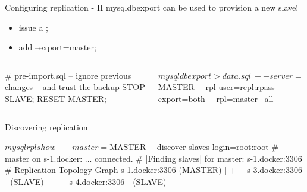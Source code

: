 \documentclass{beamer}[10]
\begin{document}
\begin{pyframe}{Configuring replication - II}
mysqldbexport can be used to provision a new slave!
\begin{itemize}
\item issue a ;
\item add --export=master;
\end{itemize}

\begin{columns}

\begin{bashcode}
# pre-import.sql
-- ignore previous changes
-- and trust the backup
STOP SLAVE;
RESET MASTER;
\end{bashcode}

\begin{pycode}
$ mysqldbexport > data.sql \
 --server=$MASTER \
 --rpl-user=repl:rpass \
 --export=both \
 --rpl=master --all

\end{pycode}
\end{columns}

\end{pyframe}



\begin{pyframe}{Discovering replication}
\begin{bashcode}
$ mysqlrplshow --master=$MASTER \
    --discover-slaves-login=root:root
# master on s-1.docker: ... connected.
# |Finding slaves| for master: s-1.docker:3306
# Replication Topology Graph
s-1.docker:3306 (MASTER)
   |
   +--- s-3.docker:3306 - (SLAVE)
   |
   +--- s-4.docker:3306 - (SLAVE)
\end{bashcode}
\end{pyframe}



%
%
\end{document}

